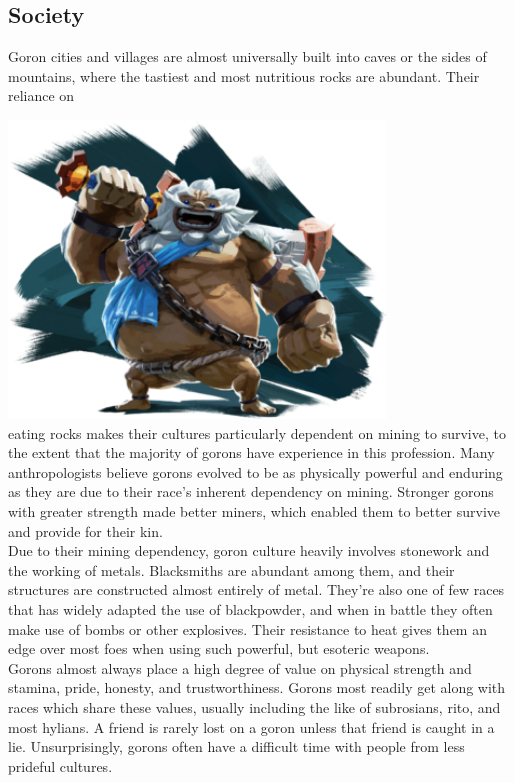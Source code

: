 \documentclass[10pt,twoside,twocolumn,openany]{book}
\begin{document}
\subsection{Society}
Goron cities and villages are almost universally built into caves or the sides of mountains, where the tastiest and most nutritious rocks are abundant. Their reliance on 

\includegraphics[width=100mm,scale=0.5]{img/daruk.png} \\

eating rocks makes their cultures particularly dependent on mining to survive, to the extent that the majority of gorons have experience in this profession. Many anthropologists believe gorons evolved to be as physically powerful and enduring as they are due to their race's inherent dependency on mining. Stronger gorons with greater strength made better miners, which enabled them to better survive and provide for their kin.\\
Due to their mining dependency, goron culture heavily involves stonework and the working of metals. Blacksmiths are abundant among them, and their structures are constructed almost entirely of metal. They're also one of few races that has widely adapted the use of blackpowder, and when in battle they often make use of bombs or other explosives. Their resistance to heat gives them an edge over most foes when using such powerful, but esoteric weapons.\\
Gorons almost always place a high degree of value on physical strength and stamina, pride, honesty, and trustworthiness. Gorons most readily get along with races which share these values, usually including the like of subrosians, rito, and most hylians. A friend is rarely lost on a goron unless that friend is caught in a lie. Unsurprisingly, gorons often have a difficult time with people from less prideful cultures.
\end{document}
